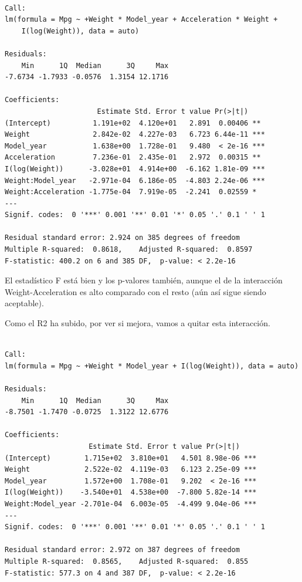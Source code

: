 \documentclass[
]{article}
\newenvironment{Shaded}{\begin{snugshade}}{\end{snugshade}}
\newcommand{\DataTypeTok}[1]{\textcolor[rgb]{0.13,0.29,0.53}{#1}}
\newcommand{\KeywordTok}[1]{\textcolor[rgb]{0.13,0.29,0.53}{\textbf{#1}}}
\newcommand{\NormalTok}[1]{#1}
\newcommand{\OperatorTok}[1]{\textcolor[rgb]{0.81,0.36,0.00}{\textbf{#1}}}
\newcommand{\StringTok}[1]{\textcolor[rgb]{0.31,0.60,0.02}{#1}}
\begin{document}
\begin{verbatim}

Call:
lm(formula = Mpg ~ +Weight * Model_year + Acceleration * Weight + 
    I(log(Weight)), data = auto)

Residuals:
    Min      1Q  Median      3Q     Max 
-7.6734 -1.7933 -0.0576  1.3154 12.1716 

Coefficients:
                      Estimate Std. Error t value Pr(>|t|)    
(Intercept)          1.191e+02  4.120e+01   2.891  0.00406 ** 
Weight               2.842e-02  4.227e-03   6.723 6.44e-11 ***
Model_year           1.638e+00  1.728e-01   9.480  < 2e-16 ***
Acceleration         7.236e-01  2.435e-01   2.972  0.00315 ** 
I(log(Weight))      -3.028e+01  4.914e+00  -6.162 1.81e-09 ***
Weight:Model_year   -2.971e-04  6.186e-05  -4.803 2.24e-06 ***
Weight:Acceleration -1.775e-04  7.919e-05  -2.241  0.02559 *  
---
Signif. codes:  0 '***' 0.001 '**' 0.01 '*' 0.05 '.' 0.1 ' ' 1

Residual standard error: 2.924 on 385 degrees of freedom
Multiple R-squared:  0.8618,    Adjusted R-squared:  0.8597 
F-statistic: 400.2 on 6 and 385 DF,  p-value: < 2.2e-16
\end{verbatim}

El estadístico F está bien y los p-valores también, aunque el de la
interacción Weight-Acceleration es alto comparado con el resto (aún así
sigue siendo aceptable).

Como el R2 ha subido, por ver si mejora, vamos a quitar esta
interacción.

\begin{Shaded}
\end{Shaded}

\begin{verbatim}

Call:
lm(formula = Mpg ~ +Weight * Model_year + I(log(Weight)), data = auto)

Residuals:
    Min      1Q  Median      3Q     Max 
-8.7501 -1.7470 -0.0725  1.3122 12.6776 

Coefficients:
                    Estimate Std. Error t value Pr(>|t|)    
(Intercept)        1.715e+02  3.810e+01   4.501 8.98e-06 ***
Weight             2.522e-02  4.119e-03   6.123 2.25e-09 ***
Model_year         1.572e+00  1.708e-01   9.202  < 2e-16 ***
I(log(Weight))    -3.540e+01  4.538e+00  -7.800 5.82e-14 ***
Weight:Model_year -2.701e-04  6.003e-05  -4.499 9.04e-06 ***
---
Signif. codes:  0 '***' 0.001 '**' 0.01 '*' 0.05 '.' 0.1 ' ' 1

Residual standard error: 2.972 on 387 degrees of freedom
Multiple R-squared:  0.8565,    Adjusted R-squared:  0.855 
F-statistic: 577.3 on 4 and 387 DF,  p-value: < 2.2e-16
\end{verbatim}
\end{document}

